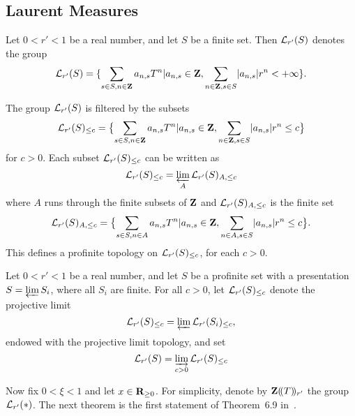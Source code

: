 \subsection{Laurent Measures}

\begin{definition}
	\label{laurent-measures-fin}
  \leanok
  Let $0 < r' < 1$ be a real number, and let $S$ be a finite set. Then $\mathcal L_{r'}(S)$ denotes the group
\[
\mathcal L_{r'}(S)=\{\sum_{s\in S,n\in \mathbf{Z}}a_{n,s}T^n \vert a_{n,s}\in \mathbf{Z}, \sum_{n\in\mathbf{Z}, s\in S}\lvert a_{n,s}\rvert r^n
< + \infty\}.
\]
\end{definition}
The group $\mathcal L_{r'}(S)$ is filtered by the subsets
\[
\mathcal L_{r'}(S)_{\leq c}=\bigl\{\sum_{s\in S,n\in \mathbf{Z}}a_{n,s}T^n \vert a_{n,s}\in \mathbf{Z}, \sum_{n\in\mathbf{Z}, s\in S}\lvert a_{n,s}\rvert r^n
\leq c\bigr\}
\]
for $c> 0$. Each subset $\mathcal L_{r'}(S)_{\leq c}$ can be written as
\[
\mathcal L_{r'}(S)_{\leq c}=\varprojlim_{A}\mathcal L_{r'}(S)_{A,\leq c}
\]
where $A$ runs through the finite subsets of $\mathbf{Z}$ and $\mathcal L_{r'}(S)_{A,\leq c}$ is the finite set
\[
\mathcal L_{r'}(S)_{A,\leq c}=\bigl\{\sum_{s\in S,n\in A}a_{n,s}T^n \vert a_{n,s}\in \mathbf{Z}, \sum_{n\in A, s\in S}\lvert a_{n,s}\rvert r^n\leq c\bigr\}.
\]
This defines a profinite topology on $\mathcal L_{r'}(S)_{\leq c}$, for each $c>0$.
\begin{definition}
  Let $0 < r' < 1$ be a real number, and let $S$ be a profinite set with a presentation $S=\varprojlim S_i$, where all $S_i$ are finite. For all $c>0$, let $\mathcal L_{r'}(S)_{\leq c}$ denote the projective limit
\[
\mathcal L_{r'}(S)_{\leq c}=\varprojlim\mathcal L_{r'}(S_i)_{\leq c},
\]
endowed with the projective limit topology, and set
\[
\mathcal L_{r'}(S)=\varinjlim_{c > 0}\mathcal L_{r'}(S)_{\leq c}
\]
\end{definition}


Now fix $0< \xi<1$ and let $x\in\mathbf{R}_{\geq 0}$. For simplicity, denote by $\mathbf{Z}(\!(T)\!)_{r'}$ the group $\mathcal L_{r'}(\ast)$. The next theorem is the first statement of Theorem~6.9 in~\cite{Analytic}.

